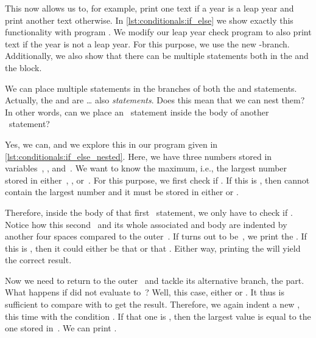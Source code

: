 This now allows us to, for example, print one text if a year is a leap year and print another text otherwise.
In \cref{lst:conditionals:if_else} we show exactly this functionality with program .
We modify our leap year check program to also print text if the year is not a leap year.
For this purpose, we use the new \nobreakdashes-branch.
Additionally, we also show that there can be multiple statements both in the  and the  block.

We can place multiple statements in the branches of both the  and  statements.
Actually, the  and  are {\dots} also \emph{statements}.
Does this mean that we can nest them?
In other words, can we place an ~statement inside the body of another ~statement?

Yes, we can, and we explore this in our program  given in \cref{lst:conditionals:if_else_nested}.
Here, we have three numbers stored in variables~, , and~.
We want to know the maximum, i.e., the largest number stored in either~, , or~.
For this purpose, we first check if \pythonIdx{>}.
If this is , then  cannot contain the largest number and it must be stored in either  or .

Therefore, inside the body of that first ~statement, we only have to check if .
Notice how this second~ and its whole associated  and body are indented by another four spaces compared to the outer~.
If  turns out to be~, we print the  .
If this is , then it could either be that  or that .
Either way, printing the   will yield the correct result.

Now we need to return to the outer~ and tackle its alternative branch, the  part.
What happens if  did not evaluate to~?
Well, this case, either  or .
It thus is sufficient to compare  with  to get the result.
Therefore, we again indent a new , this time with the condition .
If that one is , then the largest value is equal to the one stored in~.
We can print .

